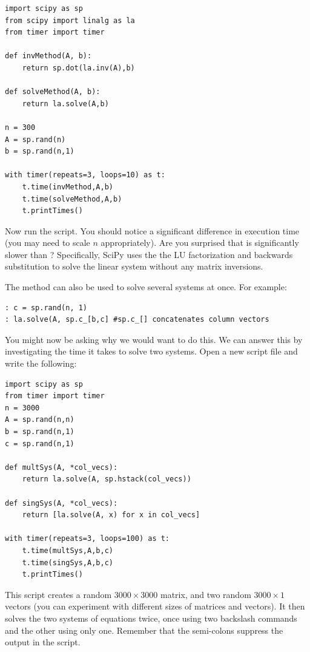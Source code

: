 \begin{lstlisting}
import scipy as sp
from scipy import linalg as la
from timer import timer

def invMethod(A, b):
    return sp.dot(la.inv(A),b)

def solveMethod(A, b):
    return la.solve(A,b)
    
n = 300
A = sp.rand(n)
b = sp.rand(n,1)

with timer(repeats=3, loops=10) as t:
	t.time(invMethod,A,b)
	t.time(solveMethod,A,b)
	t.printTimes()
\end{lstlisting}

Now run the script. You should notice a significant difference in execution time
(you may need to scale $n$ appropriately). Are you surprised that  is significantly slower than ?  Specifically, SciPy uses the
the LU factorization and backwards substitution to solve the linear system
without any matrix inversions. %

The  method can also be used to solve several systems at once. For example:

\begin{lstlisting}
: c = sp.rand(n, 1)
: la.solve(A, sp.c_[b,c] #sp.c_[] concatenates column vectors
\end{lstlisting}

You might now be asking why we would want to do this. We can answer this by
investigating the time it takes to solve two systems. Open a new script file and
write the following:

\begin{lstlisting}
import scipy as sp
from timer import timer
n = 3000
A = sp.rand(n,n)
b = sp.rand(n,1)
c = sp.rand(n,1)

def multSys(A, *col_vecs):
    return la.solve(A, sp.hstack(col_vecs))
    
def singSys(A, *col_vecs):
    return [la.solve(A, x) for x in col_vecs]

with timer(repeats=3, loops=100) as t:
    t.time(multSys,A,b,c)
    t.time(singSys,A,b,c)
    t.printTimes()
\end{lstlisting}

This script creates a random $3000 \times 3000$ matrix, and two random $3000
\times 1$ vectors (you can experiment with different sizes of matrices and
vectors). It then solves the two systems of equations twice, once using two
backslash commands and the other using only one. Remember that the semi-colons
suppress the output in the script.

